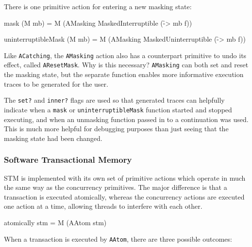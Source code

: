 There is one primitive action for entering a new masking state:

\begin{haskellcode}
mask (M mb) = M (AMasking MaskedInterruptible (\f -> mb f))

uninterruptibleMask (M mb) = M (AMasking MaskedUninterruptible (\f -> mb f))
\end{haskellcode}


Like \verb|ACatching|, the \verb|AMasking| action also has a
counterpart primitive to undo its effect, called
\verb|AResetMask|. Why is this necessary? \verb|AMasking| can both set
and reset the masking state, but the separate function enables more
informative execution traces to be generated for the user.


The \verb|set?| and \verb|inner?| flags are used so that generated
traces can helpfully indicate when a \verb|mask| or
\verb|uninterruptibleMask| function started and stopped executing, and
when an unmasking function passed in to a continuation was used. This
is much more helpful for debugging purposes than just seeing that the
masking state had been changed.

\subsubsection{Software Transactional Memory}
\label{sec:execution-primops-stm}

STM is implemented with its own set of primitive actions which operate
in much the same way as the concurrency primitives. The major
difference is that a transaction is executed atomically, whereas the
concurrency actions are executed one action at a time, allowing
threads to interfere with each other.

\begin{haskellcode}
atomically stm = M (AAtom stm)
\end{haskellcode}


When a transaction is executed by \verb|AAtom|, there are three
possible outcomes:

